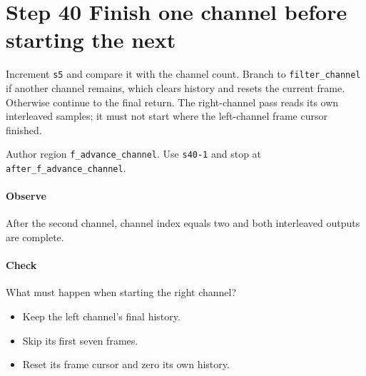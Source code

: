 \section{Step 40 Finish one channel before starting the next}\label{pcm-wav-s40}
Increment \texttt{s5} and compare it with the channel count. Branch to \texttt{filter\_channel} if another channel remains, which clears history and resets the current frame. Otherwise continue to the final return. The right-channel pass reads its own interleaved samples; it must not start where the left-channel frame cursor finished.

Author region \texttt{f\_advance\_channel}. Use \texttt{s40-1} and stop at \texttt{after\_f\_advance\_channel}.

\paragraph{Observe} After the second channel, channel index equals two and both interleaved outputs are complete.

\paragraph{Check} What must happen when starting the right channel?
\begin{itemize}
  \item[A.] Keep the left channel's final history.
  \item[B.] Skip its first seven frames.
  \item[C.] Reset its frame cursor and zero its own history.
\end{itemize}
